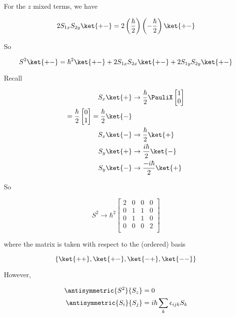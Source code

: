 For the $z$ mixed terms, we have

\begin{equation}\label{eqn:qmTwoL16:n}
2 S_{1x} S_{2y} \ket{+-}  = 2 
\left(\frac{\hbar}{2}\right)
\left(-\frac{\hbar}{2}\right)
\ket{+-}
\end{equation}

So

\begin{equation}\label{eqn:qmTwoL16:n}
S^2\ket{+-} = 
\hbar^2 \ket{+-} 
+ 2 S_{1x} S_{2x} \ket{+-} 
+ 2 S_{1y} S_{2y} \ket{+-} 
\end{equation}

Recall

\begin{align*}
S_x\ket{+} 
&\rightarrow 
\frac{\hbar}{2} \PauliX
\begin{bmatrix}
1 \\
0
\end{bmatrix} \\
=
\frac{\hbar}{2}
\begin{bmatrix}
0 \\
1 
\end{bmatrix}
=
\frac{\hbar}{2} \ket{-} \\
S_x\ket{-} 
&\rightarrow 
\frac{\hbar}{2} \ket{+} \\
S_y\ket{+} 
&\rightarrow 
\frac{i\hbar}{2} \ket{-} \\
S_y\ket{-} 
&\rightarrow 
\frac{-i\hbar}{2} \ket{+} 
\end{align*}

So

\begin{equation}\label{eqn:qmTwoL16:n}
S^2
\rightarrow 
\hbar^2
\begin{bmatrix}
2 & 0 & 0 & 0 \\
0 & 1 & 1 & 0 \\
0 & 1 & 1 & 0 \\
0 & 0 & 0 & 2 \\
\end{bmatrix}
\end{equation}

where the matrix is taken with respect to the (ordered) basis

\begin{equation}\label{eqn:qmTwoL16:n}
\{
\ket{++},
\ket{+-},
\ket{-+},
\ket{--}
\}
\end{equation}

However, 

\begin{align}\label{eqn:qmTwoL16:n}
\antisymmetric{S^2}{S_z} &= 0 \\
\antisymmetric{S_i}{S_j} &= i \hbar \sum_k \epsilon_{ijk} S_k
\end{align}

